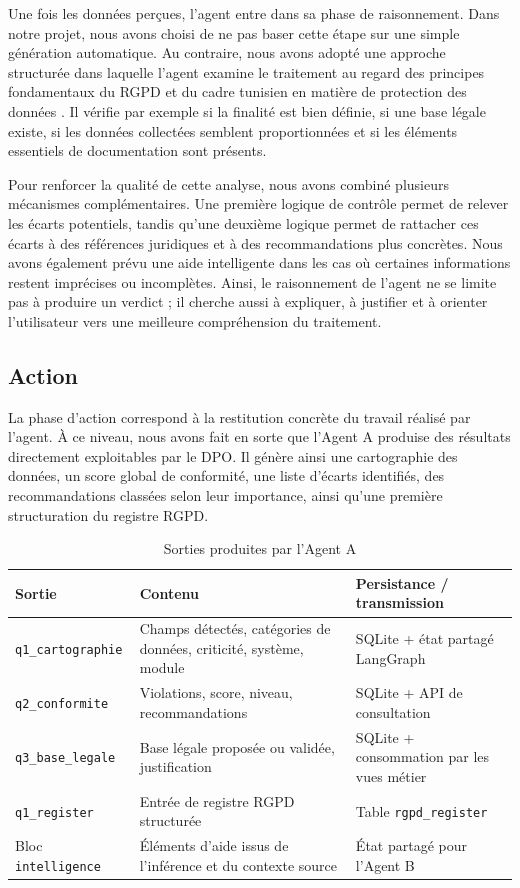 \documentclass[12pt,a4paper]{report}
\begin{document}
Une fois les données perçues, l'agent entre dans sa phase de raisonnement. Dans notre projet, nous avons choisi de ne pas baser cette étape sur une simple génération automatique. Au contraire, nous avons adopté une approche structurée dans laquelle l'agent examine le traitement au regard des principes fondamentaux du RGPD et du cadre tunisien en matière de protection des données \cite{rgpd,inpdp}. Il vérifie par exemple si la finalité est bien définie, si une base légale existe, si les données collectées semblent proportionnées et si les éléments essentiels de documentation sont présents.

Pour renforcer la qualité de cette analyse, nous avons combiné plusieurs mécanismes complémentaires. Une première logique de contrôle permet de relever les écarts potentiels, tandis qu'une deuxième logique permet de rattacher ces écarts à des références juridiques et à des recommandations plus concrètes. Nous avons également prévu une aide intelligente dans les cas où certaines informations restent imprécises ou incomplètes. Ainsi, le raisonnement de l'agent ne se limite pas à produire un verdict ; il cherche aussi à expliquer, à justifier et à orienter l'utilisateur vers une meilleure compréhension du traitement.

\subsection{Action}

La phase d'action correspond à la restitution concrète du travail réalisé par l'agent. À ce niveau, nous avons fait en sorte que l'Agent A produise des résultats directement exploitables par le DPO. Il génère ainsi une cartographie des données, un score global de conformité, une liste d'écarts identifiés, des recommandations classées selon leur importance, ainsi qu'une première structuration du registre RGPD.

\begin{table}[H]
\centering
\caption{Sorties produites par l'Agent A}
\label{tab:outputs_agent_a}
\begin{tabularx}{\textwidth}{|p{3cm}|X|p{3.2cm}|}
\hline
\textbf{Sortie} & \textbf{Contenu} & \textbf{Persistance / transmission} \\
\hline
\texttt{q1\_cartographie} & Champs détectés, catégories de données, criticité, système, module & SQLite + état partagé LangGraph \\
\hline
\texttt{q2\_conformite} & Violations, score, niveau, recommandations & SQLite + API de consultation \\
\hline
\texttt{q3\_base\_legale} & Base légale proposée ou validée, justification & SQLite + consommation par les vues métier \\
\hline
\texttt{q1\_register} & Entrée de registre RGPD structurée & Table \texttt{rgpd\_register} \\
\hline
Bloc \texttt{intelligence} & Éléments d'aide issus de l'inférence et du contexte source & État partagé pour l'Agent B \\
\hline
\end{tabularx}
\end{table}
\end{document}
